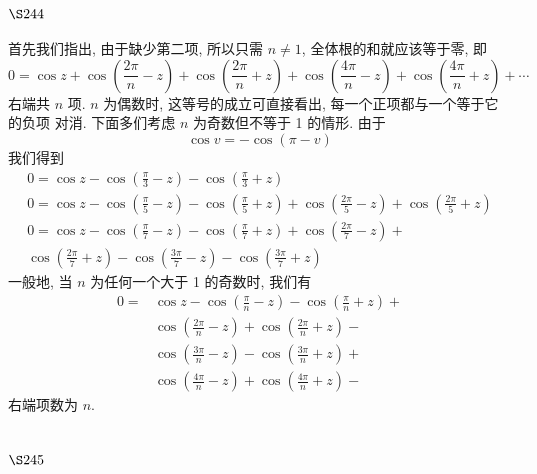 \section{$\S 244$}

首先我们指出, 由于缺少第二项, 所以只需 $n \neq 1$, 全体根的和就应该等于零, 即
\[
0=\cos z+\cos \left(\frac{2 \pi}{n}-z\right)+\cos \left(\frac{2 \pi}{n}+z\right)+\cos \left(\frac{4 \pi}{n}-z\right)+\cos \left(\frac{4 \pi}{n}+z\right)+\cdots
\]
右端共 $n$ 项. $n$ 为偶数时, 这等号的成立可直接看出, 每一个正项都与一个等于它的负项 对消. 下面多们考虑 $n$ 为奇数但不等于 1 的情形. 由于
\[
\cos v=-\cos (\pi-v)
\]
我们得到
\[
\begin{gathered}
0=\cos z-\cos \left(\frac{\pi}{3}-z\right)-\cos \left(\frac{\pi}{3}+z\right) \\
0=\cos z-\cos \left(\frac{\pi}{5}-z\right)-\cos \left(\frac{\pi}{5}+z\right)+\cos \left(\frac{2 \pi}{5}-z\right)+\cos \left(\frac{2 \pi}{5}+z\right) \\
0=\cos z-\cos \left(\frac{\pi}{7}-z\right)-\cos \left(\frac{\pi}{7}+z\right)+\cos \left(\frac{2 \pi}{7}-z\right)+ \\
\cos \left(\frac{2 \pi}{7}+z\right)-\cos \left(\frac{3 \pi}{7}-z\right)-\cos \left(\frac{3 \pi}{7}+z\right)
\end{gathered}
\]
一般地, 当 $n$ 为任何一个大于 1 的奇数时, 我们有
\[
\begin{aligned}
0= & \cos z-\cos \left(\frac{\pi}{n}-z\right)-\cos \left(\frac{\pi}{n}+z\right)+ \\
& \cos \left(\frac{2 \pi}{n}-z\right)+\cos \left(\frac{2 \pi}{n}+z\right)- \\
& \cos \left(\frac{3 \pi}{n}-z\right)-\cos \left(\frac{3 \pi}{n}+z\right)+ \\
& \cos \left(\frac{4 \pi}{n}-z\right)+\cos \left(\frac{4 \pi}{n}+z\right)-
\end{aligned}
\]
右端项数为 $n$.

\section{$\S 245$}

